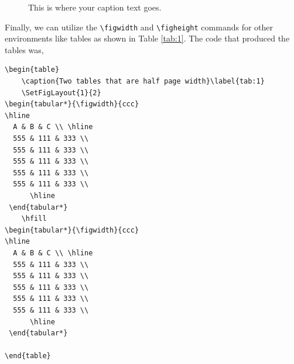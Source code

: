 \documentclass{article}
\begin{document}
\begin{figure}
    \caption{This is where your caption text goes.}\label{fig:5}
\end{figure}

Finally, we can utilize the \verb"\figwidth" and \verb"\figheight"
commands for other environments like tables as shown in Table
\ref{tab:1}.  The code that produced the tables was,

\begin{verbatim}
\begin{table}
    \caption{Two tables that are half page width}\label{tab:1}
    \SetFigLayout{1}{2}
\begin{tabular*}{\figwidth}{ccc}
\hline
  A & B & C \\ \hline
  555 & 111 & 333 \\
  555 & 111 & 333 \\
  555 & 111 & 333 \\
  555 & 111 & 333 \\
  555 & 111 & 333 \\
      \hline
 \end{tabular*}
    \hfill
\begin{tabular*}{\figwidth}{ccc}
\hline
  A & B & C \\ \hline
  555 & 111 & 333 \\
  555 & 111 & 333 \\
  555 & 111 & 333 \\
  555 & 111 & 333 \\
  555 & 111 & 333 \\
      \hline
 \end{tabular*}

\end{table}
\end{verbatim}
\end{document}
